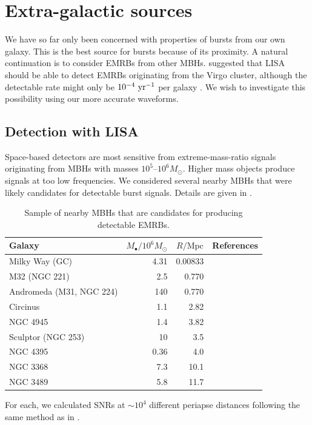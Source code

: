 \section{Extra-galactic sources}\label{sec:Extragal}

We have so far only been concerned with properties of bursts from our own galaxy. This is the best source for bursts because of its proximity. A natural continuation is to consider EMRBs from other MBHs. \citet{Rubbo2006} suggested that LISA should be able to detect EMRBs originating from the Virgo cluster, although the detectable rate might only be $10^{-4}~\mathrm{yr^{-1}}$ per galaxy \citep{Hopman2007}. We wish to investigate this possibility using our more accurate waveforms.

\subsection{Detection with LISA}

Space-based detectors are most sensitive from extreme-mass-ratio signals originating from MBHs with masses $10^5$--$10^6 M_\odot$. Higher mass objects produce signals at too low frequencies. We considered several nearby MBHs that were likely candidates for detectable burst signals. Details are given in .
\begin{table}[htp]
 \centering
  \begin{tabular}{p{} D{.}{.}{3.2} D{.}{.}{2.5} p{0.45\textwidth}}
  \toprule
   Galaxy &  &  & References \\
 \midrule
 Milky Way (GC) & 4.31 & 0.00833& \citet{Gillessen2009} \\
 M32 (NGC 221) & 2.5 & 0.770 & \citet{Verolme2002,Karachentsev2004} \\
 Andromeda (M31, NGC 224) & 140 & 0.770 &  \citet{Bender2005,Karachentsev2004} \\
 Circinus & 1.1 & 2.82 & \citet{Graham2008,Greenhill2003,Karachentsev2007} \\
 NGC 4945 & 1.4 & 3.82	& \citet{Greenhill1997,Karachentsev2007} \\
 Sculptor (NGC 253) & 10 & 3.5 & \citet{Graham2011,Rodriguez-Rico2006,Rekola2005} \\
 NGC 4395 & 0.36 & 4.0& \citet{Peterson2005,Thim2004} \\
 NGC 3368 & 7.3 & 10.1 & \citet{Graham2011,Nowak2010,Tonry2001} \\
 NGC 3489 & 5.8 & 11.7 & \citet{Graham2011,Nowak2010,Tonry2001} \\
\bottomrule
\end{tabular}
\caption{Sample of nearby MBHs that are candidates for producing detectable EMRBs.\label{tab:MBHs}}
\end{table}
For each, we calculated SNRs at $\sim 10^4$ different periapse distances following the same method as in .


